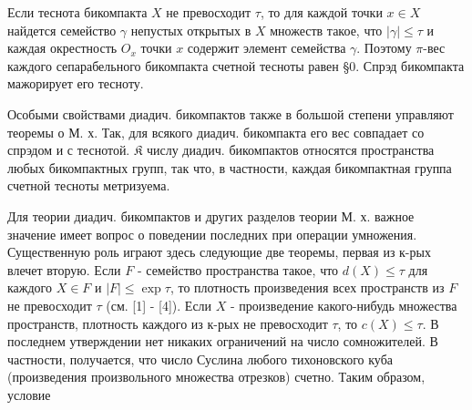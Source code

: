 \documentclass[10pt]{article}
\begin{document}
Если теснота бикомпакта $X$ не превосходит $\tau$, то для каждой точки $x \in X$ найдется семейство $\gamma$ непустых открытых в $X$ множеств такое, что $|\gamma| \leqslant \tau$ и каждая окрестность $O_{x}$ точки $x$ содержит элемент семейства $\gamma$. Поэтому $\pi$-вес каждого сепарабельного бикомпакта счетной тесноты равен §0. Спрэд бикомпакта мажорирует его тесноту.



Особыми свойствами диадич. бикомпактов также в большой степени управляют теоремы о М. х. Так, для всякого диадич. бикомпакта его вес совпадает со спрэдом и с теснотой. $\mathfrak{K}$ числу диадич. бикомпактов относятся пространства любых бикомпактных групп, так что, в частности, каждая бикомпактная группа счетной тесноты метризуема.



Для теории диадич. бикомпактов и других разделов теории М. х. важное значение имеет вопрос о поведении последних при операции умножения. Существенную роль играют здесь следующие две теоремы, первая из к-рых влечет вторую. Если $F$ - семейство пространства такое, что $d(X) \leqslant \tau$ для каждого $X \in F$ и $|F| \leqslant \exp \tau$, то плотность произведения всех пространств из $F$ не превосходит $\tau$ (см. [1] - [4]). Если $X$ - произведение какого-нибудь множества пространств, плотность каждого из к-рых не превосходит $\tau$, то $c(X) \leqslant \tau$. В последнем утверждении нет никаких ограничений на число сомножителей. В частности, получается, что число Суслина любого тихоновского куба (произведения произвольного множества отрезков) счетно. Таким образом, условие
\end{document}

